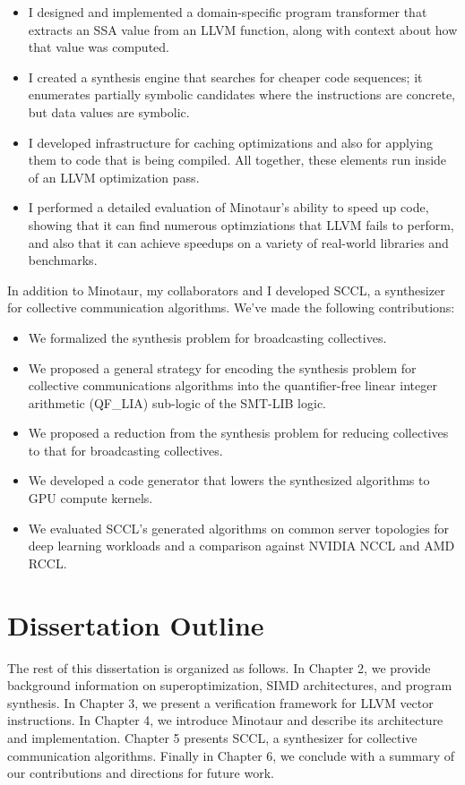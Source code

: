 \begin{itemize}
\item I designed and implemented a domain-specific program
transformer that extracts an SSA value from an LLVM function,
along with context about how that value was computed.

\item I created a synthesis engine that searches for cheaper code
sequences; it enumerates partially symbolic candidates where the
instructions are concrete, but data values are symbolic.

\item I developed infrastructure for caching optimizations and also
for applying them to code that is being compiled.
%
All together, these elements run inside of an LLVM optimization pass.

\item I performed a detailed evaluation of Minotaur's ability to
speed up code, showing that it can find numerous optimziations that
LLVM fails to perform, and also that it can achieve speedups on a
variety of real-world libraries and benchmarks.
\end{itemize}

In addition to Minotaur, my collaborators and I developed SCCL, a
synthesizer for collective communication algorithms. We've made the
following contributions:

\begin{itemize}
\item We formalized the synthesis problem for broadcasting
collectives.

\item We proposed a general strategy for encoding the synthesis
problem for collective communications algorithms into the
quantifier-free linear integer arithmetic (QF\_LIA) sub-logic of the
SMT-LIB logic.

\item We proposed a reduction from the synthesis problem for reducing collectives
to that for broadcasting collectives.

\item We developed a code generator that lowers the synthesized algorithms
to GPU compute kernels.

\item We evaluated SCCL's generated algorithms on common server
topologies for deep learning workloads and a comparison against NVIDIA NCCL
and AMD RCCL.

\end{itemize}

\section{Dissertation Outline}

The rest of this dissertation is organized as follows. In Chapter 2, we
provide background information on superoptimization, SIMD architectures,
and program synthesis. In Chapter 3, we present a verification framework
for LLVM vector instructions. In Chapter 4, we introduce Minotaur and
describe its architecture and implementation. Chapter 5 presents SCCL,
a synthesizer for collective communication algorithms. Finally in Chapter
6, we conclude with a summary of our contributions and directions for
future work.